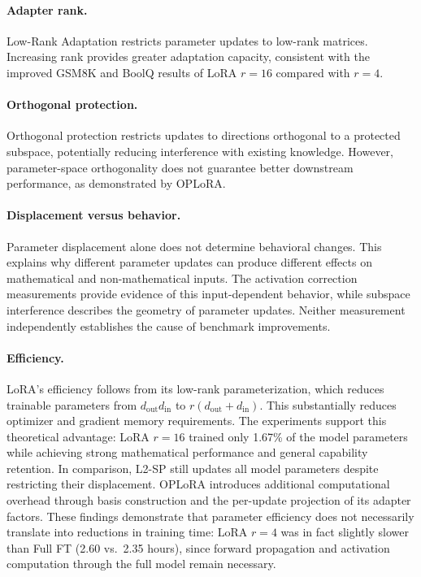 \documentclass{article}
\begin{document}
\paragraph{Adapter rank.}
Low-Rank Adaptation \citep{hu2022lora} restricts parameter updates to low-rank matrices. Increasing rank provides greater adaptation capacity, consistent with the improved GSM8K and BoolQ results of LoRA $r{=}16$ compared with $r{=}4$.

\paragraph{Orthogonal protection.}
Orthogonal protection \citep{farajtabar2020ogd} restricts updates to directions orthogonal to a protected subspace, potentially reducing interference with existing knowledge. However, parameter-space orthogonality does not guarantee better downstream performance, as demonstrated by OPLoRA.

\paragraph{Displacement versus behavior.}
Parameter displacement alone does not determine behavioral changes. This explains why different parameter updates can produce different effects on mathematical and non-mathematical inputs. The activation correction measurements provide evidence of this input-dependent behavior, while subspace interference describes the geometry of parameter updates. Neither measurement independently establishes the cause of benchmark improvements.

\paragraph{Efficiency.}
LoRA's efficiency follows from its low-rank parameterization, which reduces trainable parameters from $d_\text{out}d_\text{in}$ to $r(d_\text{out}+d_\text{in})$. This substantially reduces optimizer and gradient memory requirements. The experiments support this theoretical advantage: LoRA $r{=}16$ trained only 1.67\% of the model parameters while achieving strong mathematical performance and general capability retention. In comparison, L2-SP still updates all model parameters despite restricting their displacement. OPLoRA introduces additional computational overhead through basis construction and the per-update projection of its adapter factors. These findings demonstrate that parameter efficiency does not necessarily translate into reductions in training time: LoRA $r{=}4$ was in fact slightly slower than Full FT (2.60 vs.\ 2.35 hours), since forward propagation and activation computation through the full model remain necessary.
\end{document}
